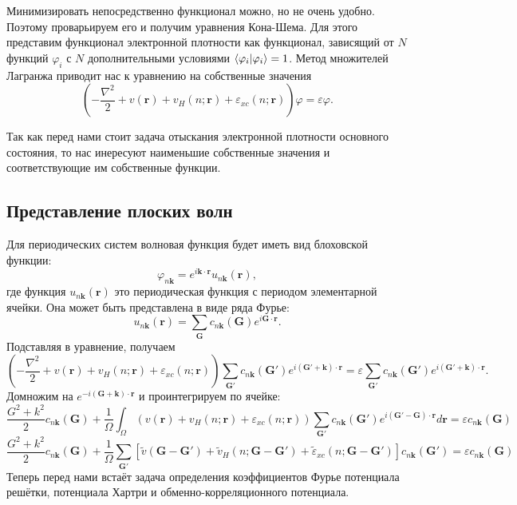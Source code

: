 \documentclass[11pt,russian]{ncc}
\newcommand{\eps}{\varepsilon}
\renewcommand{\phi}{\varphi}
\renewcommand{\vec}{\boldsymbol}
\begin{document}
    Минимизировать непосредственно функционал можно, но не очень удобно. Поэтому проварьируем его и получим уравнения Кона-Шема. Для этого представим функционал электронной плотности как функционал, зависящий от \( N \) функций \(\phi_i\) с \( N \) дополнительными условиями \( \bra{\phi_i}\ket{\phi_i} = 1 \). Метод множителей Лагранжа приводит нас к уравнению на собственные значения
    \begin{equation}
        \left(-\frac{\nabla^2}{2} + v(\vec{r}) + v_H(n;\vec{r}) + \eps_{xc}(n;\vec{r})\right)\phi = \eps\phi.
    \end{equation}

    Так как перед нами стоит задача отыскания электронной плотности основного состояния, то нас инересуют наименьшие собственные значения и соответствующие им собственные функции.

    \subsection{Представление плоских волн}
    Для периодических систем волновая функция будет иметь вид блоховской функции:
    \begin{equation}
        \phi_{n\vec{k}} = e^{i\vec{k}\cdot\vec{r}} u_{n\vec{k}}(\vec{r}),
    \end{equation}
    где функция \(u_{n\vec{k}}(\vec{r})\) это периодическая функция с периодом элементарной ячейки. Она может быть представлена в виде ряда Фурье:
    \begin{equation}
        u_{n\vec{k}}(\vec{r}) = \sum_{\vec{G}} c_{n\vec{k}}(\vec{G}) e^{i\vec{G}\cdot\vec{r}}.
    \end{equation}
    Подставляя в уравнение, получаем
    \begin{equation}
        \left(-\frac{\nabla^2}{2} + v(\vec{r}) + v_H(n;\vec{r}) + \eps_{xc}(n;\vec{r})\right)\sum_{\vec{G}'} c_{n\vec{k}}(\vec{G}') e^{i(\vec{G}' + \vec{k})\cdot\vec{r}} = \eps\sum_{\vec{G}'} c_{n\vec{k}}(\vec{G}') e^{i(\vec{G}' + \vec{k})\cdot\vec{r}}.
    \end{equation}
    Домножим на \( e^{-i(\vec{G}+\vec{k})\cdot\vec{r}} \) и проинтегрируем по ячейке:
    \begin{equation}
        \frac{G^2+k^2}{2}  c_{n\vec{k}}(\vec{G}) + \frac{1}{\Omega}\int_\Omega \left(v(\vec{r}) + v_H(n;\vec{r}) + \eps_{xc}(n;\vec{r})\right)\sum_{\vec{G}'} c_{n\vec{k}}(\vec{G}') e^{i(\vec{G}' - \vec{G})\cdot\vec{r}} d\vec{r} = \eps c_{n\vec{k}}(\vec{G})
    \end{equation}
    \begin{equation}
        \frac{G^2+k^2}{2}  c_{n\vec{k}}(\vec{G}) + \frac{1}{\Omega}\sum_{\vec{G}'}\left[\tilde{v}(\vec{G}-\vec{G}') + \tilde{v}_H(n;\vec{G} - \vec{G}') + \tilde{\eps}_{xc}(n;\vec{G} - \vec{G}')\right] c_{n\vec{k}}(\vec{G}') = \eps c_{n\vec{k}}(\vec{G})
    \end{equation}
    Теперь перед нами встаёт задача определения коэффициентов Фурье потенциала решётки, потенциала Хартри и обменно-корреляционного потенциала.
\end{document}
